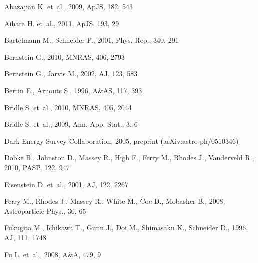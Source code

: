 \documentclass[twocolumn,useAMS,usenatbib]{mn2e}
\begin{document}
\begin{thebibliography}{}

 {Abazajian} K. et~al., 2009, ApJS, 182, 543

 {Aihara} H. et~al., 2011, ApJS, 193, 29

 {Bartelmann} M., {Schneider} P., 2001, Phys. Rep., 340, 291

 {Bernstein} G., 2010, MNRAS, 406, 2793

 {Bernstein} G., {Jarvis} M., 2002, AJ, 123, 583

 {Bertin} E., {Arnouts} S., 1996, A\&AS, 117, 393

 {Bridle} S. et~al., 2010, MNRAS, 405, 2044

 {Bridle} S. et~al., 2009, Ann. App. Stat., 3, 6

 {Dark Energy Survey Collaboration}, 2005, preprint (arXiv:astro-ph/0510346)

 {Dobke} B., {Johnston} D., {Massey} R., {High} F., {Ferry} M., {Rhodes} J., {Vanderveld} R., 2010, PASP, 122, 947

 {Eisenstein} D. et~al., 2001, AJ, 122, 2267

{Ferry} M.,  {Rhodes} J.,  {Massey} R.,  {White} M.,  
	{Coe} D.,  {Mobasher} B., 2008, Astroparticle Phys., 30, 65

 {Fukugita} M., {Ichikawa} T., {Gunn} J., {Doi} M., {Shimasaku} K., {Schneider} D., 1996, AJ, 111, 1748

 {Fu} L. et~al., 2008, A\&A, 479, 9


\end{thebibliography}
\end{document}
